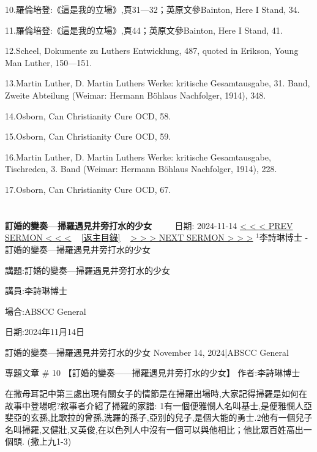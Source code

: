 \documentclass{book}
\begin{document}
10.羅倫培登:《這是我的立場》,頁31—32；英原文參Bainton, Here I Stand, 34.

11.羅倫培登:《這是我的立場》,頁44；英原文參Bainton, Here I Stand, 41.

12.Scheel, Dokumente zu Luthers Entwicklung, 487, quoted in Erikson, Young Man Luther, 150—151.

13.Martin Luther, D. Martin Luthers Werke: kritische Gesamtausgabe, 31. Band, Zweite Abteilung (Weimar: Hermann Böhlaus Nachfolger, 1914), 348.

14.Osborn, Can Christianity Cure OCD, 58.

15.Osborn, Can Christianity Cure OCD, 59.

16.Martin Luther, D. Martin Luthers Werke: kritische Gesamtausgabe, Tischreden, 3. Band (Weimar: Hermann Böhlaus Nachfolger, 1914), 228.

17.Osborn, Can Christianity Cure OCD, 67.
\newpage



\section{}
\label{sec:16}
\textbf{訂婚的變奏—掃羅遇見井旁打水的少女}
\newline
\newline
~~~~ 日期: 2024-11-14
\newline
\newline
\hyperref[sec:15]{\small{< < < PREV SERMON < < <}}
~
\hyperref[sec:index]{\small{[返主目錄]}}
~
\hyperref[sec:code]{\small{> > > NEXT SERMON > > >}}
\newline
\newline
$^{1}$李詩琳博士 - 訂婚的變奏—掃羅遇見井旁打水的少女

講題:訂婚的變奏—掃羅遇見井旁打水的少女

講員:李詩琳博士

場合:ABSCC General

日期:2024年11月14日

訂婚的變奏—掃羅遇見井旁打水的少女
November 14, 2024|ABSCC General

專題文章 \# 10
【訂婚的變奏——掃羅遇見井旁打水的少女】
作者:李詩琳博士

在撒母耳記中第三處出現有關女子的情節是在掃羅出場時,大家記得掃羅是如何在故事中登場呢?敘事者介紹了掃羅的家譜:
1有一個便雅憫人名叫基士,是便雅憫人亞斐亞的玄孫,比歌拉的曾孫,洗羅的孫子,亞別的兒子,是個大能的勇士.2他有一個兒子名叫掃羅,又健壯,又英俊,在以色列人中沒有一個可以與他相比；他比眾百姓高出一個頭. (撒上九1-3)
\end{document}
